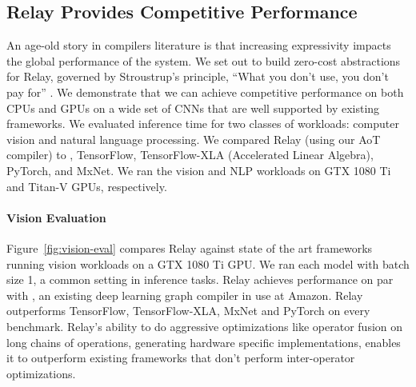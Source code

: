   \subsection{Relay Provides Competitive Performance}
  \label{sec:perf-gpu}

  \begin{figure}[h]
  \end{figure}

  \begin{figure}[h]
  \end{figure}

  An age-old story in compilers literature is that increasing expressivity
    impacts the global performance of the system.
  We set out to build zero-cost abstractions for Relay,
    governed by Stroustrup's principle, ``What you don't use, you don't pay
    for'' \citep{bjarne}.
  We demonstrate that we can achieve competitive performance on both CPUs and
    GPUs on a wide set of CNNs that are well supported by existing frameworks.
  We evaluated inference time for two classes of workloads: computer vision and natural language processing.
  We compared Relay (using our AoT compiler) to \nnvm,
    TensorFlow, TensorFlow-XLA (Accelerated Linear Algebra), PyTorch, and MxNet.
  We ran the vision and NLP workloads on GTX 1080 Ti and Titan-V GPUs, respectively.

  \paragraph{Vision Evaluation}
  Figure~\ref{fig:vision-eval} compares Relay against state of the art frameworks
    running vision workloads on a GTX 1080 Ti GPU.
  We ran each model with
    batch size 1, a common setting in inference tasks.
  Relay achieves performance on par with \nnvm,
    an existing deep learning graph compiler in use at Amazon.
  Relay outperforms TensorFlow, TensorFlow-XLA, MxNet and
    PyTorch on every benchmark.
  Relay's ability to do aggressive optimizations like operator
    fusion on long chains of operations, generating hardware
    specific implementations, enables it to outperform
    existing frameworks that don't perform inter-operator optimizations.

